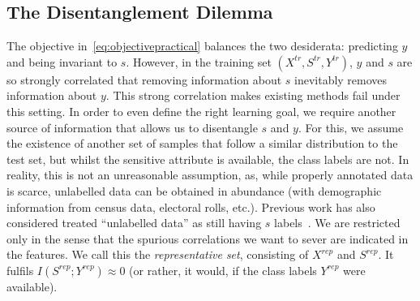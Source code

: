 \subsection{The Disentanglement Dilemma} %
The objective in~\eqref{eq:objectivepractical} balances the two desiderata: predicting $y$ and being invariant to $s$.
However, in the training set $(X^\mathit{tr}, S^\mathit{tr}, Y^\mathit{tr})$,
$y$ and $s$ are so strongly correlated that removing information about $s$ inevitably removes information about $y$.
This strong correlation makes existing methods fail under this setting.
In order to even define the right learning goal,
we require another source of information that allows us to disentangle $s$ and $y$.
For this, we assume the existence of another set of samples that follow a similar distribution to the test set,
but whilst the sensitive attribute is available, the class labels are not.
In reality, this is not an unreasonable assumption,
as, while properly annotated data is scarce, unlabelled data can be obtained in abundance (with demographic information from census data, electoral rolls, etc.).
Previous work has also considered treated ``unlabelled data'' as still having $s$ labels~\citep{wick2019unlocking}.
We are restricted only in the sense that the spurious correlations we want to sever are indicated in the features.
We call this the \emph{representative set}, consisting of $X^\mathit{rep}$ and $S^\mathit{rep}$.
It fulfils $I(S^\mathit{rep}; Y^\mathit{rep}) \approx 0$
(or rather, it would, if the class labels $Y^\mathit{rep}$ were available).


